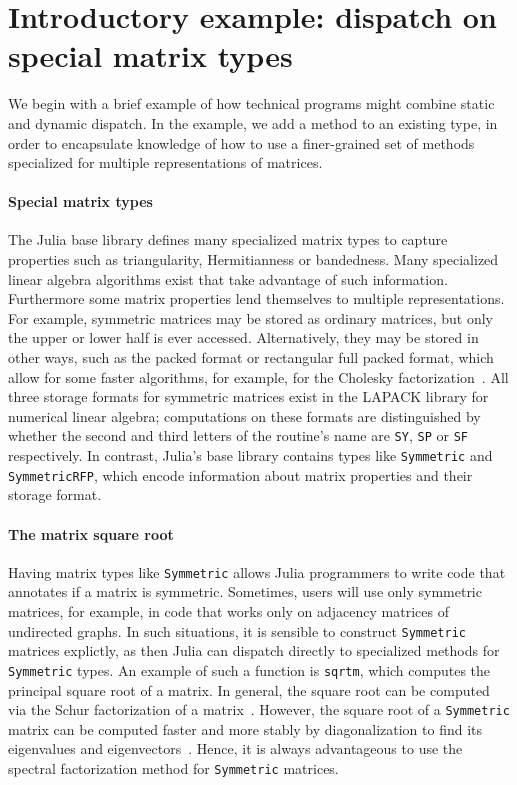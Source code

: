 \section{Introductory example: dispatch on special matrix types}

We begin with a brief example of how technical programs might combine static
and dynamic dispatch.
In the example, we add a method to an existing type, in order to encapsulate
knowledge of how to use a finer-grained set of methods specialized for
multiple representations of matrices.

\paragraph{Special matrix types}
The Julia base library defines
many specialized matrix types to capture properties
such as triangularity, Hermitianness or bandedness. Many specialized
linear algebra algorithms exist that take advantage of such information.
Furthermore some matrix properties lend themselves to multiple representations.
For example, symmetric matrices may be stored as ordinary matrices, but only
the upper or lower half is ever accessed. Alternatively, they may be stored in
other ways, such as the packed format or rectangular full packed format, which
allow for some faster algorithms, for example, for the Cholesky
factorization~\cite{Gustavson2010}. All three storage formats for symmetric
matrices exist in the LAPACK library for numerical linear algebra; computations
on these formats are distinguished by whether the second and third letters of
the routine's name are \lstinline|SY|, \lstinline|SP| or \lstinline|SF|
respectively. In contrast, Julia's base library contains types like
\lstinline|Symmetric| and \lstinline|SymmetricRFP|, which encode information
about matrix properties and their storage format.

\paragraph{The matrix square root}
Having matrix types like \lstinline|Symmetric| allows Julia programmers to
write code that annotates if a matrix is symmetric. Sometimes, users
will use only symmetric matrices, for example, in code that
works only on adjacency matrices of undirected graphs. In such situations,
it is sensible to construct \lstinline|Symmetric| matrices explictly, as then
Julia can dispatch directly to specialized methods for \lstinline|Symmetric|
types. An example of such a function is \lstinline|sqrtm|, which computes the
principal square root of a matrix. In general, the square root can be computed
via the Schur factorization of a matrix~\cite{Golub2013}. However, the square
root of a \lstinline|Symmetric| matrix can be computed faster and more stably
by diagonalization to find its eigenvalues and
eigenvectors~\cite{Higham2008,Golub2013}. Hence, it is always advantageous to
use the spectral factorization method for \lstinline|Symmetric| matrices.

